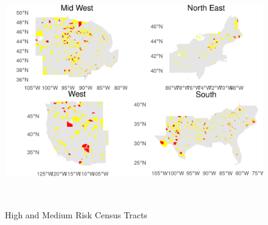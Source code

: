  \begin{figure}[htbp]
    \centering
     \includegraphics[width=\textwidth, height=10cm]{plots/regional_risk_map.png}
     \caption{High and Medium Risk Census Tracts}
     \label{fig:regional_risk_map}
 \end{figure}





\endinput